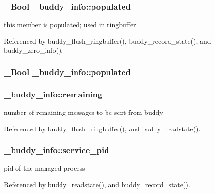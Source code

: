\subsubsection[{populated}]{\setlength{\rightskip}{0pt plus 5cm}\_\-Bool {\bf \_\-buddy\_\-info::populated}}\label{struct__buddy__info_afb40390f48fab69bc107ce7c9eaf3891}
this member is populated; used in ringbuffer 

Referenced by buddy\_\-flush\_\-ringbuffer(), buddy\_\-record\_\-state(), and buddy\_\-zero\_\-info().

\subsubsection[{populated}]{\setlength{\rightskip}{0pt plus 5cm}\_\-Bool {\bf \_\-buddy\_\-info::populated}}\label{struct__buddy__info_afb40390f48fab69bc107ce7c9eaf3891}
\subsubsection[{remaining}]{ {\bf \_\-buddy\_\-info::remaining}}\label{struct__buddy__info_a0e53404c2bbc4000dee7f9e79e384a9b}
number of remaining messages to be sent from buddy 

Referenced by buddy\_\-flush\_\-ringbuffer(), and buddy\_\-readstate().

\subsubsection[{service\_\-pid}]{ {\bf \_\-buddy\_\-info::service\_\-pid}}\label{struct__buddy__info_ac62c5f536812b863ec3016a7394baaa3}
pid of the managed process 

Referenced by buddy\_\-readstate(), and buddy\_\-record\_\-state().

